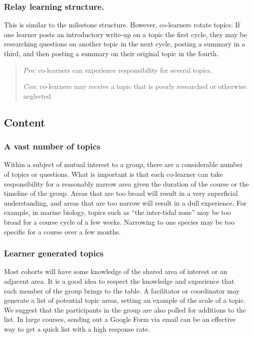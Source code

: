 \subsubsection{Relay learning
structure.}\label{relay-learning-structure.}

This is similar to the milestone structure. However, co-learners rotate
topics. If one learner posts an introductory write-up on a topic the
first cycle, they may be researching questions on another topic in the
next cycle, posting a summary in a third, and then posting a summary on
their original topic in the fourth.

\begin{quote}
\emph{Pro:} co-learners can experience responsibility for several
topics.

\emph{Con:} co-learners may receive a topic that is poorly researched or
otherwise neglected.
\end{quote}

\subsection{Content}\label{content}

\subsubsection{A vast number of topics}\label{a-vast-number-of-topics}

Within a subject of mutual interest to a group, there are a considerable
number of topics or questions. What is important is that each co-learner
can take responsibility for a reasonably narrow area given the duration
of the course or the timeline of the group. Areas that are too broad
will result in a very superficial understanding, and areas that are too
narrow will result in a dull experience. For example, in marine biology,
topics such as ``the inter-tidal zone'' may be too broad for a course
cycle of a few weeks. Narrowing to one species may be too specific for a
course over a few months.

\subsubsection{Learner generated topics}\label{learner-generated-topics}

Most cohorts will have some knowledge of the shared area of interest or
an adjacent area. It is a good idea to respect the knowledge and
experience that each member of the group brings to the table. A
facilitator or coordinator may generate a list of potential topic areas,
setting an example of the scale of a topic. We suggest that the
participants in the group are also polled for additions to the list. In
large courses, sending out a Google Form via email can be an effective
way to get a quick list with a high response rate.


